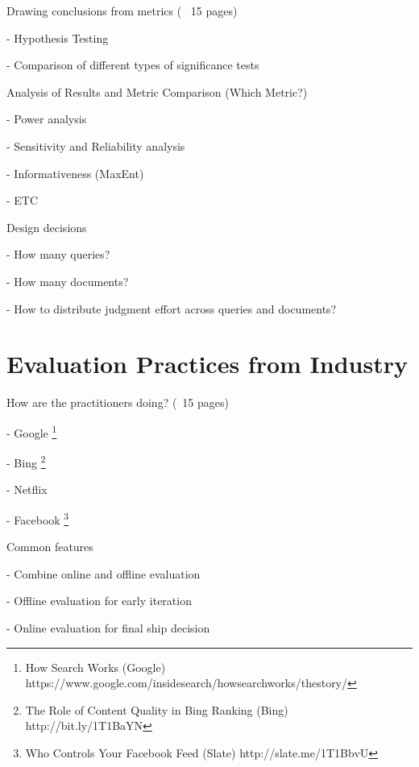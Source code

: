 \documentclass[openany]{now} %
\newcommand{\newpar}{\bigskip\noindent}
\begin{document}
Drawing conclusions from metrics (~ 15 pages)

- Hypothesis Testing \cite{Dincer:2014}

- Comparison of different types of significance tests \cite{SmuckerAC09}

\newpar
Analysis of Results and Metric Comparison (Which Metric?)

- Power analysis \cite{Sakai:2014}

- Sensitivity and Reliability analysis \cite{Urbano:2013} 

- Informativeness (MaxEnt) \cite{AslamYP05}

- ETC \cite{Bron:2013} \cite{Boytsov:2013}  \cite{Robertson:2012}


\newpar
Design decisions

- How many queries? \cite{Sakai:2014}

- How many documents? \cite{CarterettePFK09}

- How to distribute judgment effort across queries and documents? \cite{CarterettePKAA09, YilmazR09}

\chapter{Evaluation Practices from Industry}

How are the practitioners doing? (~15 pages)

-	Google \footnote{How Search Works (Google) https://www.google.com/insidesearch/howsearchworks/thestory/}

-	Bing \footnote{The Role of Content Quality in Bing Ranking (Bing)
	 http://bit.ly/1T1BaYN}

-	Netflix \cite{Gomez-Uribe2015}

-	Facebook \footnote{Who Controls Your Facebook Feed (Slate) http://slate.me/1T1BbvU}

\newpar
Common features

- Combine online and offline evaluation

- Offline evaluation for early iteration

- Online evaluation for final ship decision


\backmatter  %



	
\end{document}
